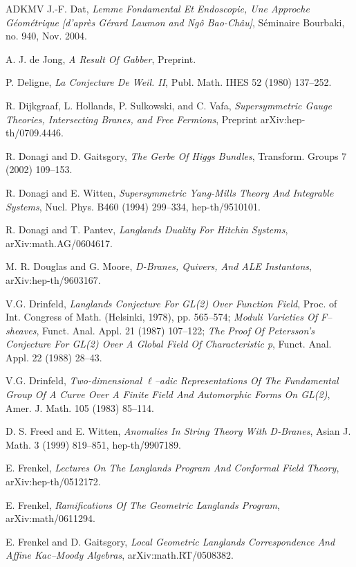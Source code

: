 \documentclass[11pt,a4paper]{article}
\begin{document}
\begin{thebibliography}{ADKMV}
 J.-F. Dat, \emph{Lemme Fondamental Et Endoscopie, Une Approche G\'eom\'etrique [d'apr\`es G\'erard Laumon and Ng\^o Bao-Ch\^au]}, S\'eminaire Bourbaki, no. 940, Nov. 2004.

 A. J. de Jong, \emph{A Result Of Gabber}, Preprint.

 P. Deligne, \emph{La Conjecture De Weil. II}, Publ. Math. IHES 52 (1980) 137--252.

 R. Dijkgraaf, L. Hollands, P. Sulkowski, and C. Vafa, \emph{Supersymmetric Gauge Theories, Intersecting Branes, and Free Fermions}, Preprint arXiv:hep-th/0709.4446.

 R. Donagi and D. Gaitsgory, \emph{The Gerbe Of Higgs Bundles}, Transform. Groups 7 (2002) 109--153.

 R. Donagi and E. Witten, \emph{Supersymmetric Yang-Mills Theory And Integrable Systems}, Nucl. Phys. B460 (1994) 299--334, hep-th/9510101.

 R. Donagi and T. Pantev, \emph{Langlands Duality For Hitchin Systems}, arXiv:math.AG/0604617.

 M. R. Douglas and G. Moore, \emph{D-Branes, Quivers, And ALE Instantons}, arXiv:hep-th/9603167.

 V.G. Drinfeld, \emph{Langlands Conjecture For GL(2) Over Function Field}, Proc. of Int. Congress of Math. (Helsinki, 1978), pp. 565--574; \emph{Moduli Varieties Of F--sheaves}, Funct. Anal. Appl. 21 (1987) 107--122; \emph{The Proof Of Petersson's Conjecture For GL(2) Over A Global Field Of Characteristic p}, Funct. Anal. Appl. 22 (1988) 28--43.

 V.G. Drinfeld, \emph{Two-dimensional $\ell$--adic Representations Of The Fundamental Group Of A Curve Over A Finite Field And Automorphic Forms On GL(2)}, Amer. J. Math. 105 (1983) 85--114.

 D. S. Freed and E. Witten, \emph{Anomalies In String Theory With D-Branes}, Asian J. Math. 3 (1999) 819--851, hep-th/9907189.

 E. Frenkel, \emph{Lectures On The Langlands Program And Conformal Field Theory}, arXiv:hep-th/0512172.

 E. Frenkel, \emph{Ramifications Of The Geometric Langlands Program}, arXiv:math/0611294.

 E. Frenkel and D. Gaitsgory, \emph{Local Geometric Langlands Correspondence And Affine Kac--Moody Algebras}, arXiv:math.RT/0508382.


\end{thebibliography}
\end{document}
